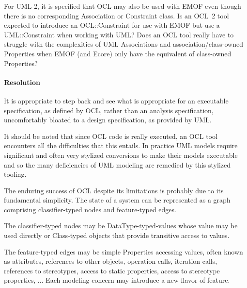 \documentclass{jot}
\begin{document}
For UML 2, it is specified that OCL may also be used with EMOF even though there is no corresponding Association or Constraint class. Is an OCL~2 tool expected to introduce an OCL::Constraint for use with EMOF but use a UML::Constraint when working with UML? Does an OCL tool really have to struggle with the complexities of UML Associations and association/class-owned Properties when EMOF (and Ecore) only have the equivalent of class-owned Properties?

\paragraph{Resolution}

It is appropriate to step back and see what is appropriate for an executable specification, as defined by OCL, rather than an analysis specification, uncomfortably bloated to a design specification, as provided by UML.

It should be noted that since OCL code is really executed, an OCL tool encounters all the difficulties that this entails. In practice UML models require significant and often very stylized conversions to make their models executable and so the many deficiencies of UML modeling are remedied by this stylized tooling.




The enduring success of OCL despite its limitations is probably due to its fundamental simplicity. The state of a system can be represented as a graph comprising classifier-typed nodes and feature-typed edges.

The classifier-typed nodes may be DataType-typed-values whose value may be used directly or Class-typed objects that provide transitive access to values.

The feature-typed edges may be simple Properties accessing values, often known as attributes, references to other objects, operation calls, iteration calls, references to stereotypes, access to static properties, access to stereotype properties, ... Each modeling concern may introduce a new flavor of feature.
\end{document}

